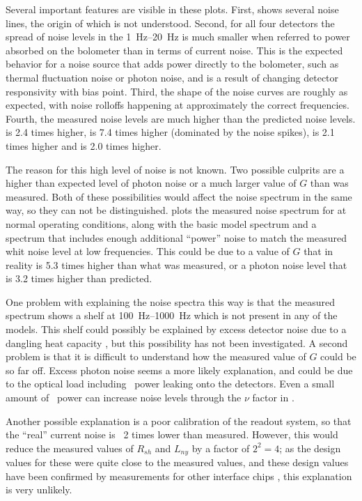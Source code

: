Several important features are visible in these plots.
First,  shows several noise lines, the origin of which is not understood.
Second, for all four detectors the spread of noise levels in the \SIrange{1}{20}{\hertz} is much smaller when referred to power absorbed on the bolometer than in terms of current noise.
This is the expected behavior for a noise source that adds power directly to the bolometer, such as thermal fluctuation noise or photon noise, and is a result of changing detector responsivity with bias point.
Third, the shape of the noise curves are roughly as expected, with noise rolloffs happening at approximately the correct frequencies.
Fourth, the measured noise levels are much higher than the predicted noise levels.
 is 2.4 times higher,  is 7.4 times higher (dominated by the noise spikes),  is 2.1 times higher and  is 2.0 times higher.

The reason for this high level of noise is not known.
Two possible culprits are a higher than expected level of photon noise or a much larger value of $G$ than was measured.
Both of these possibilities would affect the noise spectrum in the same way, so they can not be distinguished.
 plots the measured noise spectrum for  at normal operating conditions, along with the basic model spectrum and a spectrum that includes enough additional ``power'' noise to match the measured whit noise level at low frequencies.
This could be due to a value of $G$ that in reality is 5.3 times higher than what was measured, or a photon noise level that is 3.2 times higher than predicted.

One problem with explaining the noise spectra this way is that the measured spectrum shows a shelf at \SIrange{100}{1000}{\hertz} which is not present in any of the models.
This shelf could possibly be explained by excess detector noise due to a dangling heat capacity \cite{xxx}, but this possibility has not been investigated.
A second problem is that it is difficult to understand how the measured value of $G$ could be so far off.
Excess photon noise seems a more likely explanation, and could be due to the optical load including \IR\ power leaking onto the detectors.
Even a small amount of \IR\ power can increase noise levels through the $\nu$ factor in .

Another possible explanation is a poor calibration of the readout system, so that the ``real'' current noise is \abt\ 2 times lower than measured.
However, this would reduce the measured values of $R_{sh}$ and $L_{ny}$ by a factor of $2^2=4$; as the design values for these were quite close to the measured values, and these design values have been confirmed by measurements for other interface chips \cite{appel pers comm}, this explanation is very unlikely. 


